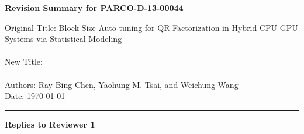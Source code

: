 \documentclass[12pt,a4paper]{article}
\begin{document}

\begin{center} {\Large{\bf Revision Summary for PARCO-D-13-00044}}
\begin{flushleft}
Original Title: Block Size Auto-tuning for QR Factorization in Hybrid CPU-GPU Systems via Statistical Modeling\\ \ \\
New Title: \\ \ \\
Authors:  Ray-Bing Chen, Yaohung M. Tsai, and Weichung Wang\\
Date: \today \\ \rule{\textwidth}{0.02in}
\end{flushleft}
\end{center}


\begin{center} \textbf{\large Replies to Reviewer 1} \end{center}



\\
{\it }\\

\\


\\
{\it}\\

\\


\\
{\it }\\

\\
\end{document}
